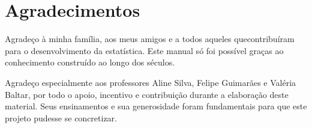 \chapter*{Agradecimentos}

Agradeço à minha família, aos meus amigos e a todos aqueles quecontribuíram para o desenvolvimento da estatística. Este manual só foi possível graças ao conhecimento construído ao longo dos séculos.

Agradeço especialmente aos professores Aline Silva, Felipe Guimarães e Valéria Baltar, por todo o apoio, incentivo e contribuição durante a elaboração deste material. Seus ensinamentos e sua generosidade foram fundamentais para que este projeto pudesse se concretizar.